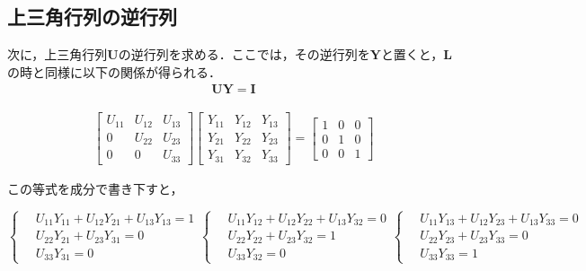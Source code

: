 \documentclass[dvipdfmx]{jsarticle}
\begin{document}
\subsection{上三角行列の逆行列}
次に，上三角行列$\boldsymbol{U}$の逆行列を求める．ここでは，その逆行列を$\boldsymbol{Y}$と置くと，$\boldsymbol{L}$の時と同様に以下の関係が得られる．\\

\begin{align}
    \boldsymbol{UY}=\boldsymbol{I}
\end{align}

\begin{align}
    \begin{bmatrix}
        U_{11} & U_{12} & U_{13} \\
        0 & U_{22} & U_{23} \\
        0 & 0 & U_{33}
    \end{bmatrix}
    \begin{bmatrix}
        Y_{11} & Y_{12} & Y_{13} \\
        Y_{21} & Y_{22} & Y_{23} \\
        Y_{31} & Y_{32} & Y_{33}
    \end{bmatrix}
    =
    \begin{bmatrix}
        1 & 0 & 0 \\
        0 & 1 & 0 \\
        0 & 0 & 1
    \end{bmatrix}
\end{align}

この等式を成分で書き下すと，

\begin{equation}
    \left\{ \,
        \begin{aligned}
            & U_{11}Y_{11}+U_{12}Y_{21}+U_{13}Y_{13}=1 \\
            & U_{22}Y_{21}+U_{23}Y_{31}=0 \\
            & U_{33}Y_{31}=0
        \end{aligned}
    \right.
    \left\{ \,
        \begin{aligned}
            & U_{11}Y_{12}+U_{12}Y_{22}+U_{13}Y_{32}=0 \\
            & U_{22}Y_{22}+U_{23}Y_{32}=1 \\
            & U_{33}Y_{32}=0
        \end{aligned}
    \right.
    \left\{ \,
        \begin{aligned}
            & U_{11}Y_{13}+U_{12}Y_{23}+U_{13}Y_{33}=0 \\
            & U_{22}Y_{23}+U_{23}Y_{33}=0 \\
            & U_{33}Y_{33}=1
        \end{aligned}
    \right.
\end{equation}
\end{document}
